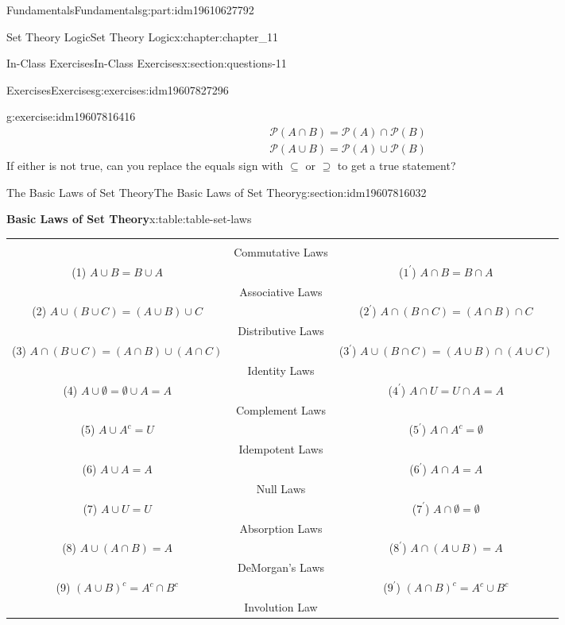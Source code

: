 \documentclass[oneside,10pt,]{book}
\newcommand{\tabularfont}{\relax}
\numberwithin{equation}{section}
\newcommand{\hrulethin}  {\noalign{\hrule height 0.04em}}
\begin{document}
\begin{partptx}{Fundamentals}{}{Fundamentals}{}{}{g:part:idm19610627792}
\begin{chapterptx}{Set Theory Logic}{}{Set Theory Logic}{}{}{x:chapter:chapter_11}
\begin{sectionptx}{In-Class Exercises}{}{In-Class Exercises}{}{}{x:section:questions-11}
\begin{exercises-subsection-numberless}{Exercises}{}{Exercises}{}{}{g:exercises:idm19607827296}
\begin{exercisegroup}
\begin{divisionexerciseeg}{3}{}{}{g:exercise:idm19607816416}
\begin{gather*}
\mathcal{P}(A \cap B) = \mathcal{P}(A) \cap \mathcal{P}(B)\\
\mathcal{P}(A \cup B) = \mathcal{P}(A) \cup \mathcal{P}(B)
\end{gather*}
If either is not true, can you replace the equals sign with \(\subseteq\) or \(\supseteq\) to get a true statement?%
\end{divisionexerciseeg}%
\end{exercisegroup}
\par\medskip\noindent
\end{exercises-subsection-numberless}
\end{sectionptx}
%
%
\typeout{************************************************}
\typeout{************************************************}
%
\begin{sectionptx}{The Basic Laws of Set Theory}{}{The Basic Laws of Set Theory}{}{}{g:section:idm19607816032}
\begin{tableptx}{\textbf{Basic Laws of Set Theory}}{x:table:table-set-laws}{}%
\centering%
{\tabularfont%
\begin{tabular}{ccc}
&&\tabularnewline[0pt]
&Commutative Laws&\tabularnewline[0pt]
(1) \(A \cup B = B \cup  A\)&&(\(1^{\prime}\)) \(A \cap B = B\cap A\)\tabularnewline\hrulethin
&Associative Laws&\tabularnewline[0pt]
(2) \(A \cup  (B \cup  C)= (A\cup B)\cup C\)&&(\(2^{\prime}\)) \(A \cap  (B \cap  C) = (A \cap  B) \cap  C \)\tabularnewline\hrulethin
&Distributive Laws&\tabularnewline[0pt]
(3) \(A\cap (B \cup  C)=(A\cap B )\cup (A\cap  C)\)&&(\(3^{\prime}\)) \(A \cup (B \cap C) = (A \cup B ) \cap (A\cup C)\)\tabularnewline\hrulethin
&Identity Laws&\tabularnewline[0pt]
(4) \(A \cup  \emptyset  = \emptyset  \cup  A = A\)&&(\(4^{\prime}\)) \(A \cap  U = U \cap  A = A\)\tabularnewline\hrulethin
&Complement Laws&\tabularnewline[0pt]
(5) \(A\cup A^c= U\)&&(\(5^{\prime}\)) \(A\cap A^c= \emptyset\)\tabularnewline\hrulethin
&Idempotent Laws&\tabularnewline[0pt]
(6) \(A \cup  A = A\)&&(\(6^{\prime}\)) \(A\cap  A = A\)\tabularnewline\hrulethin
&Null Laws&\tabularnewline[0pt]
(7) \(A \cup  U = U\)&&(\(7^{\prime}\)) \(A \cap  \emptyset  =\emptyset\)\tabularnewline\hrulethin
&Absorption Laws&\tabularnewline[0pt]
(8) \(A \cup  (A\cap  B) = A\)&&(\(8^{\prime}\)) \(A\cap (A \cup  B) = A\)\tabularnewline\hrulethin
&DeMorgan's Laws&\tabularnewline[0pt]
(9) \((A \cup  B)^c= A^c\cap  B^c\)&&(\(9^{\prime}\)) \((A\cap  B)^c = A^c \cup  B^c\)\tabularnewline\hrulethin
&Involution Law&\tabularnewline[0pt]

\end{tabular}}
\end{tableptx}
\end{sectionptx}
\end{chapterptx}
\end{partptx}
\end{document}
